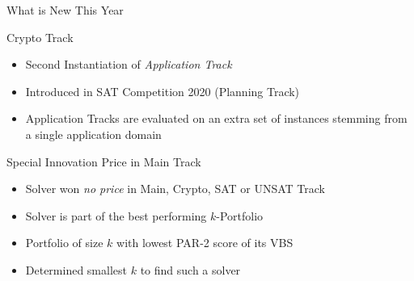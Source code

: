\documentclass{beamer}
\begin{document}
\begin{frame}{What is New This Year}

\begin{block}{Crypto Track}
  \begin{itemize}
  \item Second Instantiation of \emph{Application Track}
  \item Introduced in SAT Competition 2020 (Planning Track)
  \item Application Tracks are evaluated on an extra set of instances stemming from a single application domain
  \end{itemize}
\end{block}

\begin{block}{Special Innovation Price in Main Track}
  \begin{itemize}
  \item Solver won \emph{no price} in Main, Crypto, SAT or UNSAT Track 
  \item Solver is part of the best performing $k$-Portfolio
  \item Portfolio of size $k$ with lowest PAR-2 score of its VBS
  \item Determined smallest $k$ to find such a solver
  \end{itemize}
\end{block}

\end{frame}
\end{document}
